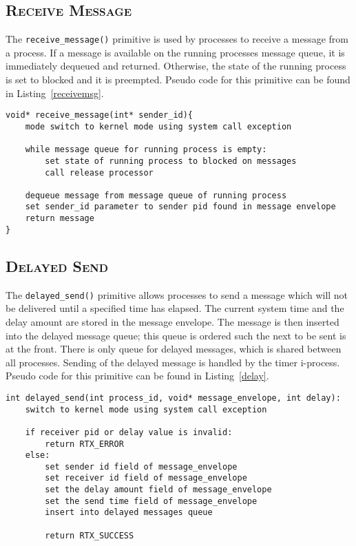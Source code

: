 \documentclass[oneside]{report}
\begin{document}
\subsection{\textsc{Receive Message}}

The \texttt{receive\_message()} primitive is used by processes to
receive a message from a process. If a message is available on the
running processes message queue, it is immediately dequeued and
returned. Otherwise, the state of the running process is set to
blocked and it is preempted. Pseudo code for this primitive can be
found in Listing~\ref{receivemsg}.

\begin{lstlisting}
void* receive_message(int* sender_id){
    mode switch to kernel mode using system call exception

    while message queue for running process is empty:
        set state of running process to blocked on messages
        call release processor

    dequeue message from message queue of running process
    set sender_id parameter to sender pid found in message envelope
    return message
}
\end{lstlisting}

\subsection{\textsc{Delayed Send}}

The \texttt{delayed\_send()} primitive allows processes to send a
message which will not be delivered until a specified time has
elapsed. The current system time and the delay amount are stored in
the message envelope. The message is then inserted into the delayed
message queue; this queue is ordered such the next to be sent is at
the front. There is only queue for delayed messages, which is shared
between all processes. Sending of the delayed message is handled by
the timer i-process. Pseudo code for this primitive can be found in
Listing~\ref{delay}.

\begin{lstlisting}
int delayed_send(int process_id, void* message_envelope, int delay):
    switch to kernel mode using system call exception

    if receiver pid or delay value is invalid:
        return RTX_ERROR
    else:
        set sender id field of message_envelope
        set receiver id field of message_envelope
        set the delay amount field of message_envelope
        set the send time field of message_envelope
        insert into delayed messages queue

        return RTX_SUCCESS
\end{lstlisting}
\end{document}
